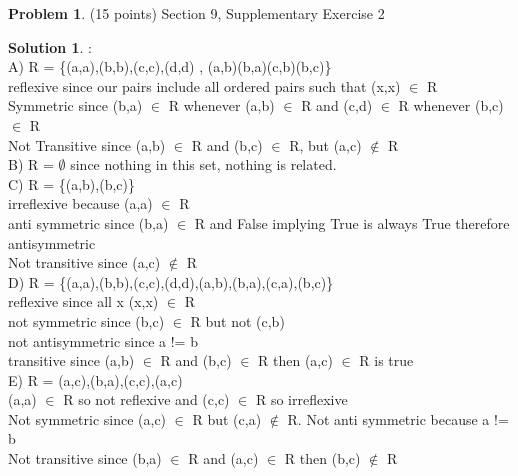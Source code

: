 \documentclass{article}
\theoremstyle{definition}
\newtheorem{problem}{Problem}
\newtheorem*{solution}{Solution}
\begin{document}
\begin{problem} (15 points) Section 9, Supplementary Exercise 2
\end{problem}
\begin{solution} :
\\

A) R = \{(a,a),(b,b),(c,c),(d,d) , (a,b)(b,a)(c,b)(b,c)\} \\
reflexive since our pairs include all ordered pairs such that (x,x) $\in$ R \\
Symmetric since (b,a) $\in$ R whenever (a,b) $\in$ R and (c,d) $\in$ R whenever (b,c) $\in$ R \\
Not Transitive since (a,b) $\in$ R and (b,c) $\in$ R, but (a,c) $\notin$ R \\

B) R = $\emptyset$ since nothing in this set, nothing is related. \\

C) R = \{(a,b),(b,c)\}\\
irreflexive because (a,a) $\in$ R \\
anti symmetric since (b,a) $\in$ R and False implying True is always True therefore antisymmetric \\
Not transitive since (a,c) $\notin$ R \\

D) R = \{(a,a),(b,b),(c,c),(d,d),(a,b),(b,a),(c,a),(b,c)\}
\\
reflexive since all x (x,x) $\in$ R
\\
not symmetric since (b,c) $\in$ R but not (c,b)
\\
not antisymmetric since a != b\\
transitive since (a,b) $\in$ R and (b,c) $\in$ R then (a,c) $\in$ R is true \\

E) R = {(a,c),(b,a),(c,c),(a,c)} \\
(a,a) $\in$ R so not reflexive and (c,c) $\in$ R so irreflexive \\
Not symmetric since (a,c) $\in$ R but (c,a) $\notin$ R. Not anti symmetric because a != b\\
Not transitive since (b,a) $\in$ R and (a,c) $\in$ R then (b,c) $\notin$ R

\end{solution}

\newpage
\end{document}
